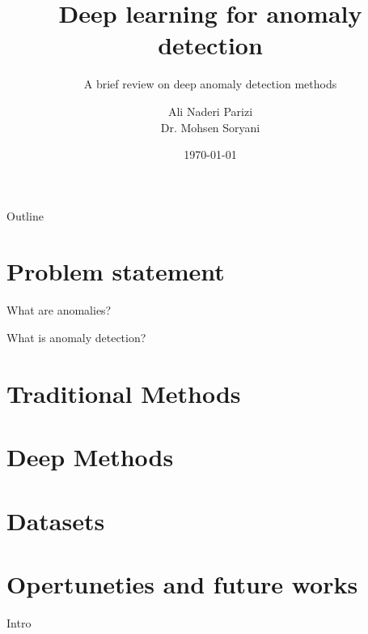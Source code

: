 \documentclass{beamer}
\title{Deep learning for anomaly detection}
\subtitle{A brief review on deep anomaly detection methods}
\author{Ali Naderi Parizi \\ Dr.  Mohsen Soryani}
\institute{Iran University of Sciance and technology}
\date{\today}
\begin{document}
	
	\begin{frame}
    		\titlepage
	\end{frame}
	\begin{frame}{Outline}
		    \tableofcontents
	\end{frame}
	\section{Problem statement}
	\begin{frame}{What are anomalies?}
	\end{frame}
	\begin{frame}{What is anomaly detection?}
	\end{frame}
	\section{Traditional Methods}
	\section{Deep Methods}
	\section{Datasets}
	\section{Opertuneties and future works}
	\begin{frame}{Intro}
	\end{frame}
\end{document}
